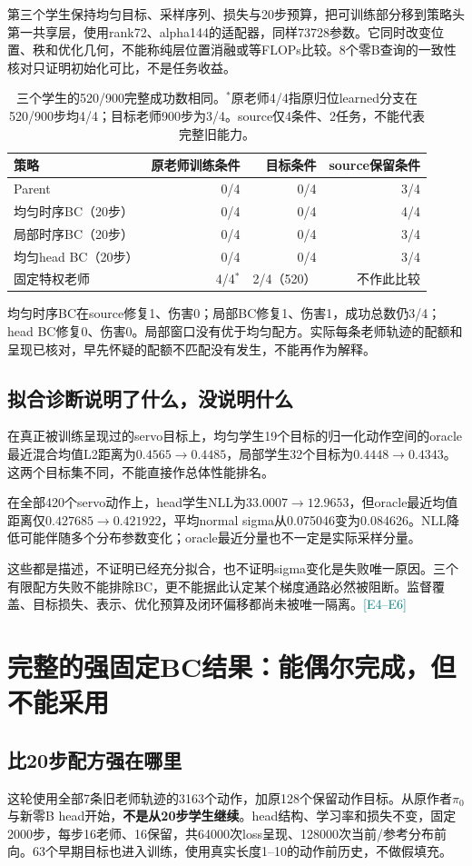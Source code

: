 \documentclass[UTF8,a4paper,fontset=none,zihao=-4]{ctexart}
\newcommand{\ev}[1]{\textcolor{teal}{\small[#1]}}
\begin{document}
第三个学生保持均匀目标、采样序列、损失与20步预算，把可训练部分移到策略头第一共享层，使用rank72、alpha144的适配器，同样73728参数。它同时改变位置、秩和优化几何，不能称纯层位置消融或等FLOPs比较。8个零B查询的一致性核对只证明初始化可比，不是任务收益。
\par
\begin{table}[htbp]\centering\small
\noindent\begin{tabularx}{\textwidth}{Yrrr}\toprule
策略 & 原老师训练条件 & 目标条件 & source保留条件\\\midrule
Parent &0/4&0/4&3/4\\
均匀时序BC（20步） &0/4&0/4&4/4\\
局部时序BC（20步） &0/4&0/4&3/4\\
均匀head BC（20步） &0/4&0/4&3/4\\
固定特权老师 &4/4$^{*}$&2/4（520）&不作此比较\\\bottomrule
\end{tabularx}
\caption{三个学生的520/900完整成功数相同。$^{*}$原老师4/4指原归位learned分支在520/900步均4/4；目标老师900步为3/4。source仅4条件、2任务，不能代表完整旧能力。}
\end{table}
\par
均匀时序BC在source修复1、伤害0；局部BC修复1、伤害1，成功总数仍3/4；head BC修复0、伤害0。局部窗口没有优于均匀配方。实际每条老师轨迹的配额和呈现已核对，早先怀疑的配额不匹配没有发生，不能再作为解释。
\subsection{拟合诊断说明了什么，没说明什么}
在真正被训练呈现过的servo目标上，均匀学生19个目标的归一化动作空间的oracle最近混合均值L2距离为$0.4565\to0.4485$，局部学生32个目标为$0.4448\to0.4343$。这两个目标集不同，不能直接作总体性能排名。

在全部420个servo动作上，head学生NLL为$33.0007\to12.9653$，但oracle最近均值距离仅$0.427685\to0.421922$，平均normal sigma从0.075046变为0.084626。NLL降低可能伴随多个分布参数变化；oracle最近分量也不一定是实际采样分量。

这些都是描述，不证明已经充分拟合，也不证明sigma变化是失败唯一原因。三个有限配方失败不能排除BC，更不能据此认定某个梯度通路必然被阻断。监督覆盖、目标损失、表示、优化预算及闭环偏移都尚未被唯一隔离。\ev{E4--E6}
\section{完整的强固定BC结果：能偶尔完成，但不能采用}
\subsection{比20步配方强在哪里}
这轮使用全部7条旧老师轨迹的3163个动作，加原128个保留动作目标。从原作者$\pi_0$与新零B head开始，\textbf{不是从20步学生继续}。head结构、学习率和损失不变，固定2000步，每步16老师、16保留，共64000次loss呈现、128000次当前/参考分布前向。63个早期目标也进入训练，使用真实长度1--10的动作前历史，不做假填充。
\end{document}
